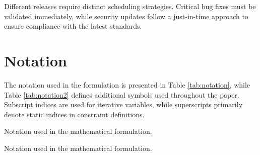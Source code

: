 \documentclass[12pt]{article}
\begin{document}
Different releases require distinct scheduling strategies. Critical bug fixes must be validated immediately, while security updates follow a just-in-time approach to ensure compliance with the latest standards.

\section*{Notation}

The notation used in the formulation is presented in Table \ref{tab:notation}, while Table \ref{tab:notation2} defines additional symbols used throughout the paper. Subscript indices are used for iterative variables, while superscripts primarily denote static indices in constraint definitions.

\begin{table}[h]
    \centering
    \caption{Notation used in the mathematical formulation.}
    \label{tab:notation}
\end{table}

\begin{table}[h]
    \centering
    \caption{Notation used in the mathematical formulation.}
    \label{tab:notation2}
\end{table}









\end{document}
